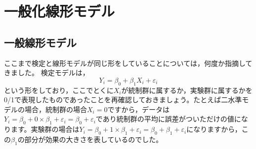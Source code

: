 \documentclass{ltjsbook}
\begin{document}
\chapter{一般化線形モデル}
\VerbatimFootnotes
\label{x24_linearModel}
\section{一般線形モデル}
ここまで検定と線形モデルが同じ形をしていることについては，何度か指摘してきました。
検定モデルは，
\[ Y_{i} = \beta_0 + \beta_1 X_{i} + \varepsilon_{i}\]
という形をしており，ここでとくに$X_{i}$が統制群に属するか，実験群に属するかを0/1で表現したものであったことを再確認しておきましょう。たとえば二水準モデルの場合，統制群の場合$X_i=0$ですから，データは$Y_i = \beta_0 + 0\times \beta_1+ \varepsilon_{i} = \beta_0+ \varepsilon_{i}$であり統制群の平均に誤差がついただけの値になります。実験群の場合は$Y_i = \beta_0 + 1 \times \beta_1 + \varepsilon_{i}= \beta_0 + \beta_1+ \varepsilon_{i}$になりますから，この$\beta_1$の部分が効果の大きさを表しているのでした。
\end{document}
